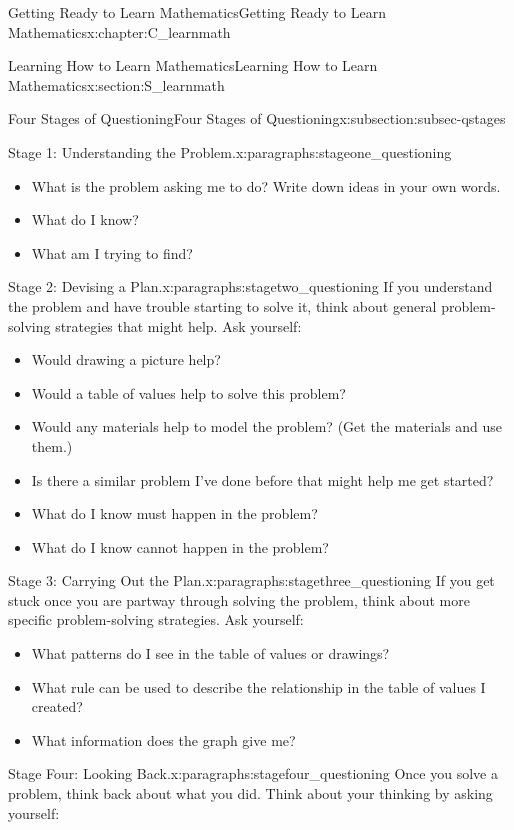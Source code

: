 \documentclass[oneside,10pt,]{book}
\numberwithin{equation}{chapter}
\begin{document}
\begin{chapterptx}{Getting Ready to Learn Mathematics}{}{Getting Ready to Learn Mathematics}{}{}{x:chapter:C_learnmath}
\begin{sectionptx}{Learning How to Learn Mathematics}{}{Learning How to Learn Mathematics}{}{}{x:section:S_learnmath}
\begin{subsectionptx}{Four Stages of Questioning}{}{Four Stages of Questioning}{}{}{x:subsection:subsec-qstages}
\begin{paragraphs}{Stage 1: Understanding the Problem.}{x:paragraphs:stageone_questioning}
%
\begin{itemize}[label=\textbullet]
\item{}What is the problem asking me to do? Write down ideas in your own words.%
\item{}What do I know?%
\item{}What am I trying to find?%
\end{itemize}
%
\end{paragraphs}%
\begin{paragraphs}{Stage 2: Devising a Plan.}{x:paragraphs:stagetwo_questioning}%
If you understand the problem and have trouble starting to solve it, think about general problem-solving strategies that might help. Ask yourself:%
\par
%
\begin{itemize}[label=\textbullet]
\item{}Would drawing a picture help?%
\item{}Would a table of values help to solve this problem?%
\item{}Would any materials help to model the problem? (Get the materials and use them.)%
\item{}Is there a similar problem I've done before that might help me get started?%
\item{}What do I know must happen in the problem?%
\item{}What do I know cannot happen in the problem?%
\end{itemize}
%
\end{paragraphs}%
\begin{paragraphs}{Stage 3: Carrying Out the Plan.}{x:paragraphs:stagethree_questioning}%
If you get stuck once you are partway through solving the problem, think about more specific problem-solving strategies. Ask yourself:%
\par
%
\begin{itemize}[label=\textbullet]
\item{}What patterns do I see in the table of values or drawings?%
\item{}What rule can be used to describe the relationship in the table of values I created?%
\item{}What information does the graph give me?%
\end{itemize}
%
\end{paragraphs}%
\begin{paragraphs}{Stage Four: Looking Back.}{x:paragraphs:stagefour_questioning}%
Once you solve a problem, think back about what you did. Think about your thinking by asking yourself:%

\end{paragraphs}
\end{subsectionptx}
\end{sectionptx}
\end{chapterptx}
\end{document}
